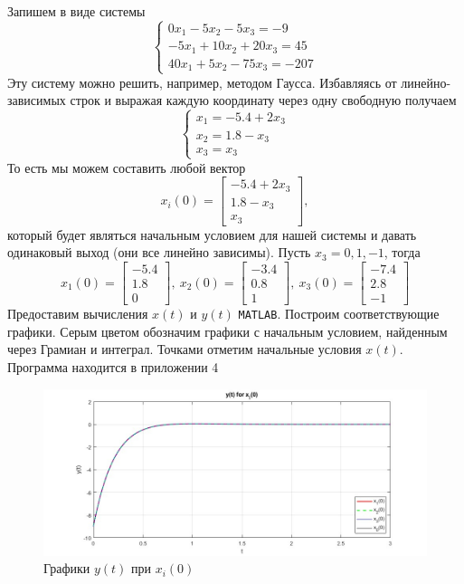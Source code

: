 \documentclass[a4paper, 12pt]{article}
\begin{document}
    Запишем в виде системы
    $$
    \begin{cases}
        0x_1-5x_2-5x_3=-9\\
        -5x_1+10x_2+20x_3=45\\
        40x_1+5x_2-75x_3=-207
    \end{cases}
    $$
    Эту систему можно решить, например, методом Гаусса. Избавляясь от линейно-зависимых строк
    и выражая каждую координату через одну свободную получаем
    $$
    \begin{cases}
        x_1=-5.4+2x_3\\
        x_2=1.8-x_3\\
        x_3=x_3
    \end{cases}
    $$
    То есть мы можем составить любой вектор
    $$
    x_i(0)=\begin{bmatrix}
        -5.4+2x_3\\
        1.8-x_3\\
        x_3
    \end{bmatrix},
    $$
    который будет являться начальным условием для нашей системы и давать одинаковый выход (они все линейно зависимы).
    Пусть $x_3=0,1,-1$, тогда
    $$
    x_1(0)=\begin{bmatrix}
        -5.4\\ 1.8\\ 0
    \end{bmatrix},\ x_2(0)=\begin{bmatrix}
        -3.4\\ 0.8\\ 1
    \end{bmatrix},\ x_3(0)=\begin{bmatrix}
        -7.4\\ 2.8\\ -1
    \end{bmatrix}
    $$
    Предоставим вычисления $x(t)$ и $y(t)$ \texttt{MATLAB}. Построим соответствующие графики.
    Серым цветом обозначим графики с начальным условием, найденным через Грамиан и интеграл.
    Точками отметим начальные условия $x(t)$. Программа находится в приложении 4
    \begin{figure}[H]
        \centering
        \includegraphics[scale=0.45]{task_4_y_t_f_t_x_i.jpg}
        \captionsetup{skip=0pt}
        \caption{Графики $y(t)$ при $x_i(0)$}
        \label{fig:task_4_modeling_2}
    \end{figure}
\end{document}
